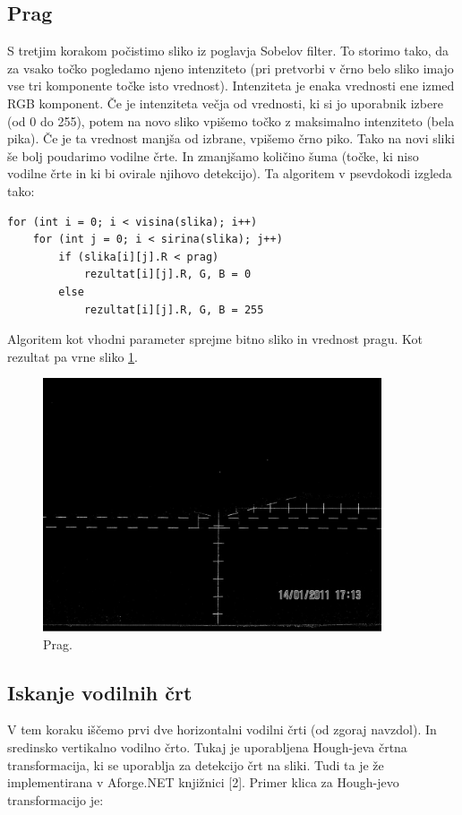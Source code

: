 \documentclass[oneside, a4paper, 12pt]{book}
\begin{document}
\subsection{Prag}
S tretjim korakom počistimo sliko iz poglavja Sobelov filter. To storimo tako, da za vsako točko pogledamo njeno intenziteto (pri pretvorbi v črno belo sliko imajo vse tri komponente točke isto vrednost). Intenziteta je enaka vrednosti ene izmed RGB komponent. Če je intenziteta večja od vrednosti, ki si jo uporabnik izbere (od 0 do 255), potem na novo sliko vpišemo točko z maksimalno intenziteto (bela pika). Če je ta vrednost manjša od izbrane, vpišemo črno piko. Tako na novi sliki še bolj poudarimo vodilne črte. In zmanjšamo količino šuma (točke, ki niso vodilne črte in ki bi ovirale njihovo detekcijo). Ta algoritem v psevdokodi izgleda tako:
\begin{verbatim}
for (int i = 0; i < visina(slika); i++)
    for (int j = 0; i < sirina(slika); j++)
        if (slika[i][j].R < prag)
            rezultat[i][j].R, G, B = 0
        else
            rezultat[i][j].R, G, B = 255
\end{verbatim}

Algoritem kot vhodni parameter sprejme bitno sliko in vrednost pragu. Kot rezultat pa vrne sliko \ref{pic:treshold}.

\begin{figure}
\begin{center}
\includegraphics[width=10cm]{slike/treshold.jpg}
\end{center}
\caption{Prag.}
\label{pic:treshold}
\end{figure}


\subsection{Iskanje vodilnih črt}
V tem koraku iščemo prvi dve horizontalni vodilni črti (od zgoraj navzdol). In sredinsko vertikalno vodilno črto. Tukaj je uporabljena Hough-jeva črtna transformacija, ki se uporablja za detekcijo črt na sliki. Tudi ta je že implementirana v Aforge.NET knjižnici [2]. Primer klica za Hough-jevo transformacijo je:
\end{document}
